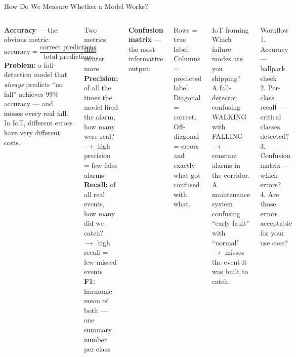 \documentclass[aspectratio=169,11pt]{beamer}
\begin{document}
\begin{frame}[shrink=8]{How Do We Measure Whether a Model Works?}
    \begin{columns}
        \textbf{Accuracy} --- the obvious metric:
        \[\text{accuracy} = \frac{\text{correct predictions}}{\text{total predictions}}\]
        \textbf{Problem:} a fall-detection model that \emph{always} predicts ``no fall'' achieves 99\% accuracy --- and misses every real fall. In IoT, different errors have very different costs.

        \vspace{0.2cm}
        \begin{block}{Two metrics that matter more}
            \textbf{Precision:} of all the times the model fired the alarm, how many were real?\\
            $\rightarrow$ high precision = few false alarms\\[4pt]
            \textbf{Recall:} of all real events, how many did we catch?\\
            $\rightarrow$ high recall = few missed events\\[4pt]
            \textbf{F1:} harmonic mean of both --- one summary number per class
        \end{block}

        \textbf{Confusion matrix} --- the most informative output:

        \vspace{0.1cm}
        {\small Rows = true label. Columns = predicted label. Diagonal = correct. Off-diagonal = errors and exactly what got confused with what.}

        \vspace{0.2cm}
        \begin{alertblock}{IoT framing}
            {\small Which failure modes are you shipping?\\
            A fall-detector confusing WALKING with FALLING $\rightarrow$ constant alarms in the corridor.\\
            A maintenance system confusing ``early fault'' with ``normal'' $\rightarrow$ misses the event it was built to catch.}
        \end{alertblock}

        \vspace{0.15cm}
        \begin{exampleblock}{Workflow}
            {\small 1. Accuracy --- ballpark check\\
            2. Per-class recall --- critical classes detected?\\
            3. Confusion matrix --- which errors?\\
            4. Are those errors acceptable for your use case?}
        \end{exampleblock}
    \end{columns}
\end{frame}
\end{document}
